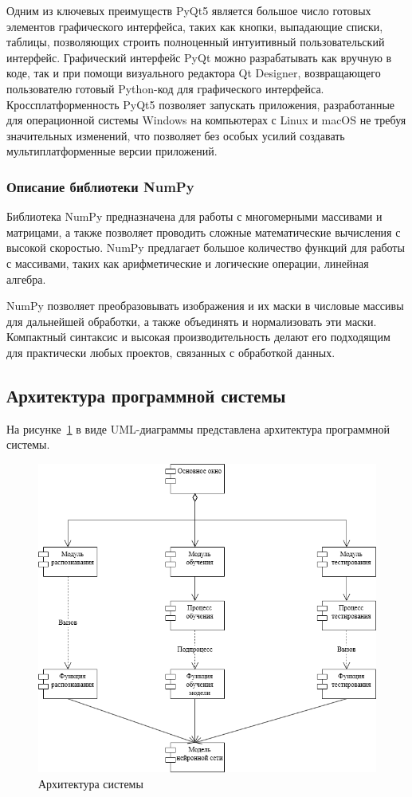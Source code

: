 Одним из ключевых преимуществ PyQt5 является большое число готовых элементов графического интерфейса, таких как кнопки, выпадающие списки, таблицы, позволяющих строить полноценный интуитивный пользовательский интерфейс. Графический интерфейс PyQt можно разрабатывать как вручную в коде, так и при помощи визуального редактора Qt Designer, возвращающего пользователю готовый Python-код для графического интерфейса. Кроссплатформенность PyQt5 позволяет запускать приложения, разработанные для операционной системы Windows на компьютерах с Linux и macOS не требуя значительных изменений, что позволяет без особых усилий создавать мультиплатформенные версии приложений.

\subsubsection{Описание библиотеки NumPy}

Библиотека NumPy предназначена для работы с многомерными массивами и матрицами, а также позволяет проводить сложные математические вычисления с высокой скоростью. NumPy предлагает большое количество функций для работы с массивами, таких как арифметические и логические операции, линейная алгебра. 

NumPy позволяет преобразовывать изображения и их маски в числовые массивы для дальнейшей обработки, а также объединять и нормализовать эти маски. Компактный синтаксис и высокая производительность делают его подходящим для практически любых проектов, связанных с обработкой данных. 

\subsection{Архитектура программной системы}

На рисунке~\ref{fig:structure} в виде UML-диаграммы представлена архитектура программной системы.  

\begin{figure}[h]
	\centering
	\includegraphics[width=0.7\linewidth]{images/компоненты}
	\caption{Архитектура системы}
	\label{fig:structure}
\end{figure}

